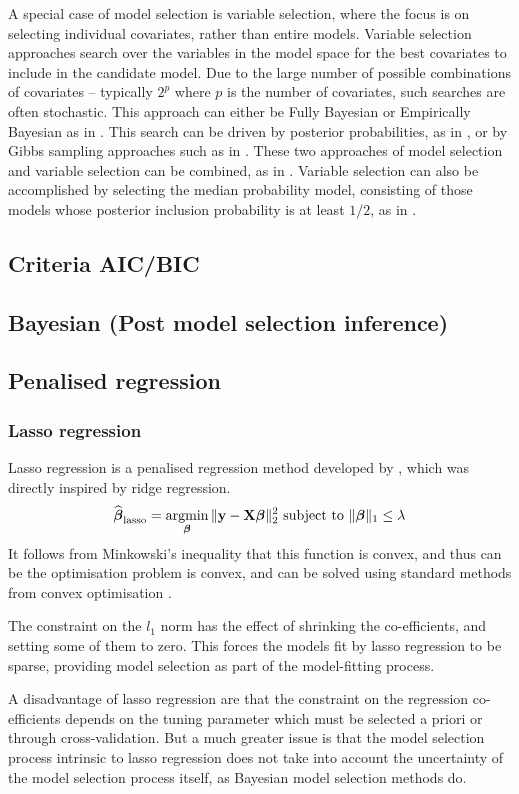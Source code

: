 \documentclass{amsart}[12pt]
\begin{document}
A special case of model selection is variable selection, where the focus is on selecting individual
covariates, rather than entire models. Variable selection approaches search over the
variables in the model space for the best covariates to include in the candidate model. Due to the large
number of possible combinations of covariates -- typically $2^p$ where $p$ is the number of covariates, such
searches are often stochastic. This approach can either be Fully Bayesian or Empirically Bayesian as in
\citep{Cui2008}.  This search can be driven by posterior probabilities, as in \citep{Casella2006}, or by Gibbs
sampling approaches such as in \citep{George1993}. These two approaches of model selection and variable
selection can be combined, as in \citep{Geweke1996}. Variable selection can also be accomplished by selecting
the median probability model, consisting of those models whose posterior inclusion probability is at least
$1/2$, as in \citep{Barbieri2004}.

\subsection{Criteria AIC/BIC}
\subsection{Bayesian (Post model selection inference)}
\subsection{Penalised regression}
\subsubsection{Lasso regression}
Lasso regression is a penalised regression method developed by \citep{Tibshirani1996}, which was directly
inspired by ridge regression.
$$
\widehat{\vbeta}_{\text{lasso}} = \argmin_\vbeta \|\vy - \mX \vbeta\|_2^2 \text{ subject to } \|\vbeta\|_1 \leq \lambda
$$
It follows from Minkowski's inequality that this function is convex, and thus can be the optimisation problem
is convex, and can be solved using standard methods from convex optimisation \citep{Boyd2010}.

The constraint on the $l_1$ norm has the effect of shrinking the co-efficients, and setting some of them to
zero. This forces the models fit by lasso regression to be sparse, providing model selection as part of the
model-fitting process.

A disadvantage of lasso regression are that the constraint on the regression co-efficients depends on the
tuning parameter which must be selected a priori or through cross-validation. But a much greater issue is that
the model selection process intrinsic to lasso regression does not take into account the uncertainty of the
model selection process itself, as Bayesian model selection methods do.
\end{document}
